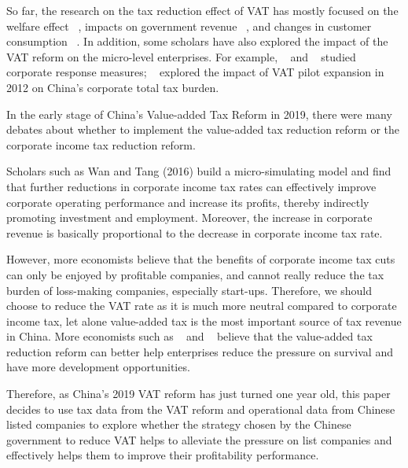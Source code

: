 \documentclass[3p,times]{elsarticle}
\begin{document}
So far, the research on the tax reduction effect of VAT has mostly focused on the welfare effect ~\cite{blomquist2001tax, emran2005selective, whalley2005vat, carbonnier2007pays}, impacts on government revenue ~\cite{nichele1995simulation, jenkins2000vat, moore2015tax}, and changes in customer consumption ~\cite{blundell2009assessing, barrell2009economics}. In addition, some scholars have also explored the impact of the VAT reform on the micro-level enterprises. For example, ~\citet{shoup1969experience} and ~\citep{onji2009response} studied corporate response measures; ~\citet{fang2017asymmetric} explored the impact of VAT pilot expansion in 2012 on China's corporate total tax burden.

In the early stage of China's Value-added Tax Reform in 2019, there were many debates about whether to implement the value-added tax reduction reform or the corporate income tax reduction reform. 

Scholars such as {\color{red} Wan and Tang (2016)} build a micro-simulating model and find that further reductions in corporate income tax rates can effectively improve corporate operating performance and increase its profits, thereby indirectly promoting investment and employment. Moreover, the increase in corporate revenue is basically proportional to the decrease in corporate income tax rate.

However, more economists believe that the benefits of corporate income tax cuts can only be enjoyed by profitable companies, and cannot really reduce the tax burden of loss-making companies, especially start-ups. Therefore, we should choose to reduce the VAT rate as it is much more neutral compared to corporate income tax, let alone value-added tax is the most important source of tax revenue in China. More economists such as {\color{red} ~\citet{tang2020vatreduction} and ~\citet{yue2020empirical}} believe that the value-added tax reduction reform can better help enterprises reduce the pressure on survival and have more development opportunities.

Therefore, as China's 2019 VAT reform has just turned one year old, this paper decides to use tax data from the VAT reform and operational data from Chinese listed companies to explore whether the strategy chosen by the Chinese government to reduce VAT helps to alleviate the pressure on list companies and effectively helps them to improve their profitability performance.
\end{document}

